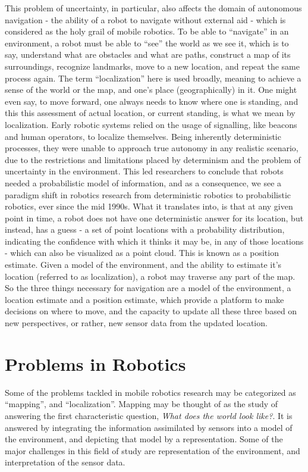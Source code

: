 This problem of uncertainty, in particular, also affects the domain of autonomous navigation - the ability of a robot to navigate without external
aid - which is considered as the holy grail of mobile robotics. To be able to ``navigate'' in an environment, a robot must be able to ``see'' the 
world as we see it, which is to say, understand what are obstacles and what are paths, construct a map of its surroundings, 
recognize landmarks, move to a new location, and repeat the same process again. The term ``localization'' here is used broadly, meaning to 
achieve a sense of the world or
the map, and one's place (geographically) in it. One might even say, to move forward, one always needs to know where one is standing, and this 
this assessment of actual location, or current standing, is what we mean by localization. Early robotic systems relied on the usage 
of signalling, like
beacons and human operators, to localize themselves. Being inherently deterministic processes, they were unable to approach true autonomy in
any realistic scenario,
due to the restrictions and limitations placed by determinism and the problem of uncertainty in the environment. This led researchers to conclude
that robots needed a probabilistic model of information, and as a consequence, we see a paradigm shift in robotics research from deterministic
robotics to probabilistic robotics, ever since the mid 1990s. What it translates into, is that at any given point in time, a robot does not have
one deterministic answer for its location, but instead, has a guess - a set of point locations with a probability 
distribution, indicating the confidence with which it thinks it may be, in any of those locations - which can also be visualized as a point cloud.
This is known as a position estimate. Given
a model of the environment, and the ability to estimate it's location (referred to as localization), a robot may traverse any part of the map.
So the three things necessary for navigation are a model of the environment, a location estimate and a position estimate, which provide a
platform to make decisions on where to move, and the capacity to update all these three based on new perspectives, or rather, new sensor data
from the updated location.

\section{Problems in Robotics}
\label{sec:robo-problems}
Some of the problems tackled in mobile robotics research may be categorized as ``mapping'', and ``localization''. Mapping may be thought of
as the study of answering the first characteristic question, \emph{What does the world look like?}. It is answered by integrating the 
information assimilated by sensors into a model of the environment, and depicting that model by a representation. Some of the major challenges
in this field of study are representation of the environment, and interpretation of the sensor data.

